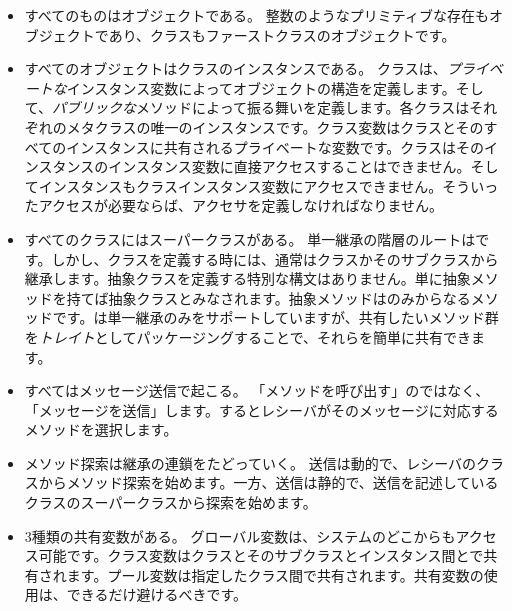 \documentclass[a4paper,10pt,twoside]{book}
\begin{document}
\begin{itemize}
  \item すべてのものはオブジェクトである。
  整数のようなプリミティブな存在もオブジェクトであり、クラスもファーストクラスのオブジェクトです。

  \item すべてのオブジェクトはクラスのインスタンスである。
  クラスは、\emph{プライベートな}インスタンス変数によってオブジェクトの構造を定義します。そして、\emph{パブリックな}メソッドによって振る舞いを定義します。各クラスはそれぞれのメタクラスの唯一のインスタンスです。クラス変数はクラスとそのすべてのインスタンスに共有されるプライベートな変数です。クラスはそのインスタンスのインスタンス変数に直接アクセスすることはできません。そしてインスタンスもクラスインスタンス変数にアクセスできません。そういったアクセスが必要ならば、アクセサを定義しなければなりません。

  \item すべてのクラスにはスーパークラスがある。
  単一継承の階層のルートはです。しかし、クラスを定義する時には、通常はクラスかそのサブクラスから継承します。抽象クラスを定義する特別な構文はありません。単に抽象メソッドを持てば抽象クラスとみなされます。抽象メソッドはのみからなるメソッドです。\pharo は単一継承のみをサポートしていますが、共有したいメソッド群を\emph{トレイト}としてパッケージングすることで、それらを簡単に共有できます。

  \item すべてはメッセージ送信で起こる。
	「メソッドを呼び出す」のではなく、「メッセージを送信」します。するとレシーバがそのメッセージに対応するメソッドを選択します。

  \item メソッド探索は継承の連鎖をたどっていく。
  \self 送信は動的で、レシーバのクラスからメソッド探索を始めます。一方、\super 送信は静的で、\super 送信を記述しているクラスのスーパークラスから探索を始めます。
  
  \item 3種類の共有変数がある。
	グローバル変数は、システムのどこからもアクセス可能です。クラス変数はクラスとそのサブクラスとインスタンス間とで共有されます。プール変数は指定したクラス間で共有されます。共有変数の使用は、できるだけ避けるべきです。

\end{itemize}

\ifx\wholebook\relax\else
   
   
\end{document}
